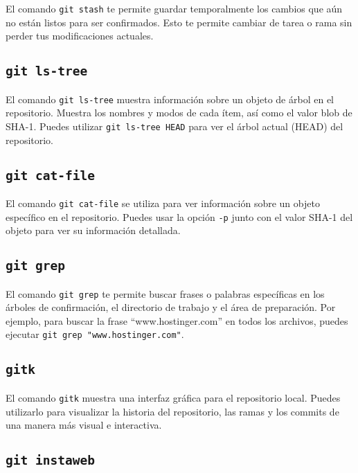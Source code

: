\documentclass[
  a4paper,
]{article}
\begin{document}
El comando \texttt{git\ stash} te permite guardar temporalmente los
cambios que aún no están listos para ser confirmados. Esto te permite
cambiar de tarea o rama sin perder tus modificaciones actuales.

\subsection{\texorpdfstring{\texttt{git\ ls-tree}}{git ls-tree}}\label{git-ls-tree}

El comando \texttt{git\ ls-tree} muestra información sobre un objeto de
árbol en el repositorio. Muestra los nombres y modos de cada ítem, así
como el valor blob de SHA-1. Puedes utilizar \texttt{git\ ls-tree\ HEAD}
para ver el árbol actual (HEAD) del repositorio.

\subsection{\texorpdfstring{\texttt{git\ cat-file}}{git cat-file}}\label{git-cat-file}

El comando \texttt{git\ cat-file} se utiliza para ver información sobre
un objeto específico en el repositorio. Puedes usar la opción
\texttt{-p} junto con el valor SHA-1 del objeto para ver su información
detallada.

\subsection{\texorpdfstring{\texttt{git\ grep}}{git grep}}\label{git-grep}

El comando \texttt{git\ grep} te permite buscar frases o palabras
específicas en los árboles de confirmación, el directorio de trabajo y
el área de preparación. Por ejemplo, para buscar la frase
``www.hostinger.com'' en todos los archivos, puedes ejecutar
\texttt{git\ grep\ "www.hostinger.com"}.

\subsection{\texorpdfstring{\texttt{gitk}}{gitk}}\label{gitk}

El comando \texttt{gitk} muestra una interfaz gráfica para el
repositorio local. Puedes utilizarlo para visualizar la historia del
repositorio, las ramas y los commits de una manera más visual e
interactiva.

\subsection{\texorpdfstring{\texttt{git\ instaweb}}{git instaweb}}\label{git-instaweb}
\end{document}
